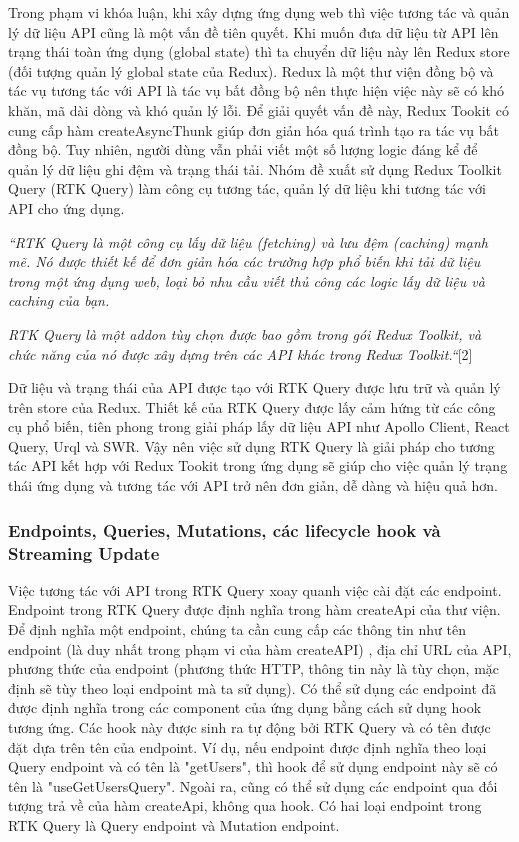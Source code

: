 Trong phạm vi khóa luận, khi xây dựng ứng dụng web thì việc tương tác và quản lý dữ liệu API cũng là một vấn đề tiên quyết.
Khi muốn đưa dữ liệu từ API lên trạng thái toàn ứng dụng (global state) thì ta chuyển dữ liệu này lên Redux store (đối tượng quản lý global state của Redux).
Redux là một thư viện đồng bộ và tác vụ tương tác với API là tác vụ bất đồng bộ nên thực hiện việc này sẽ có khó khăn, mã dài dòng và khó quản lý lỗi.
Để giải quyết vấn đề này, Redux Tookit có cung cấp hàm createAsyncThunk giúp đơn giản hóa quá trình tạo ra tác vụ bất đồng bộ.
Tuy nhiên, người dùng vẫn phải viết một số lượng logic đáng kể để quản lý dữ liệu ghi đệm và trạng thái tải.
Nhóm đề xuất sử dụng Redux Toolkit Query (RTK Query) làm công cụ tương tác, quản lý dữ liệu khi tương tác với API cho ứng dụng. 
\par

\textit{“RTK Query là một công cụ lấy dữ liệu (fetching) và lưu đệm (caching) mạnh mẽ.
Nó được thiết kế để đơn giản hóa các trường hợp phổ biến khi tải dữ liệu trong một ứng dụng web, loại bỏ nhu cầu viết thủ công các logic lấy dữ liệu và caching của bạn.}
\par

\textit{RTK Query là một addon tùy chọn được bao gồm trong gói Redux Toolkit, và chức năng của nó được xây dựng trên các API khác trong Redux Toolkit.“}[2]
\par

Dữ liệu và trạng thái của API được tạo với RTK Query được lưu trữ và quản lý trên store của Redux.
Thiết kế của RTK Query được lấy cảm hứng từ các công cụ phổ biến, tiên phong trong giải pháp lấy dữ liệu API như Apollo Client, React Query, Urql và SWR.
Vậy nên việc sử dụng RTK Query là giải pháp cho tương tác API kết hợp với Redux Tookit trong ứng dụng sẽ giúp cho việc quản lý trạng thái ứng dụng và tương tác với API trở nên đơn giản, dễ dàng và hiệu quả hơn.

\subsubsection{Endpoints, Queries, Mutations, các lifecycle hook và Streaming Update}

\tab Việc tương tác với API trong RTK Query xoay quanh việc cài đặt các endpoint.
Endpoint trong RTK Query được định nghĩa trong hàm createApi của thư viện.
Để định nghĩa một endpoint, chúng ta cần cung cấp các thông tin như tên endpoint (là duy nhất trong phạm vi của hàm createAPI) , địa chỉ URL của API, phương thức của endpoint (phương thức HTTP, thông tin này là tùy chọn, mặc định sẽ tùy theo loại endpoint mà ta sử dụng). 
Có thể sử dụng các endpoint đã được định nghĩa trong các component của ứng dụng bằng cách sử dụng hook tương ứng.
Các hook này được sinh ra tự động bởi RTK Query và có tên được đặt dựa trên tên của endpoint.
Ví dụ, nếu endpoint được định nghĩa theo loại Query endpoint và có tên là "getUsers", thì hook để sử dụng endpoint này sẽ có tên là "useGetUsersQuery".
Ngoài ra, cũng có thể sử dụng các endpoint  qua đối tượng trả về của hàm createApi, không qua hook.
Có hai loại endpoint trong RTK Query là Query endpoint và Mutation endpoint.


